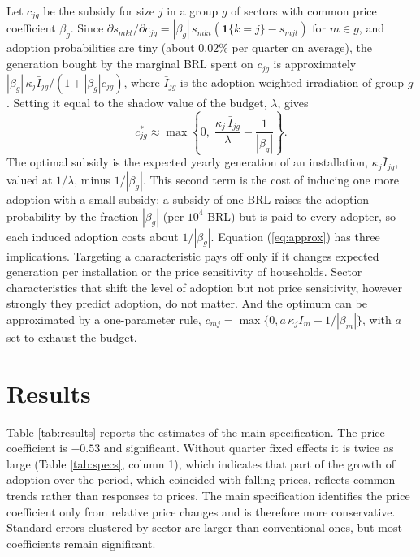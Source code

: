 \documentclass[final,3p,times,authoryear]{elsarticle}
\begin{document}
    Let $c_{jg}$ be the subsidy for size $j$ in a group $g$ of sectors with common price coefficient $\beta_g$. Since $\partial s_{mkt}/\partial c_{jg} = |\beta_g|\, s_{mkt}(\mathbf{1}\{k=j\} - s_{mjt})$ for $m \in g$, and adoption probabilities are tiny (about 0.02\% per quarter on average), the generation bought by the marginal BRL spent on $c_{jg}$ is approximately $|\beta_g|\, \kappa_j \bar I_{jg} / (1 + |\beta_g| c_{jg})$, where $\bar I_{jg}$ is the adoption-weighted irradiation of group $g$. Setting it equal to the shadow value of the budget, $\lambda$, gives
    \begin{equation}
        c^{*}_{jg} \approx \max\left\{0,\; \frac{\kappa_j\, \bar I_{jg}}{\lambda} - \frac{1}{|\beta_g|}\right\}.
        \label{eq:approx}
    \end{equation}
    The optimal subsidy is the expected yearly generation of an installation, $\kappa_j \bar I_{jg}$, valued at $1/\lambda$, minus $1/|\beta_g|$. This second term is the cost of inducing one more adoption with a small subsidy: a subsidy of one BRL raises the adoption probability by the fraction $|\beta_g|$ (per $10^4$ BRL) but is paid to every adopter, so each induced adoption costs about $1/|\beta_g|$. Equation (\ref{eq:approx}) has three implications. Targeting a characteristic pays off only if it changes expected generation per installation or the price sensitivity of households. Sector characteristics that shift the level of adoption but not price sensitivity, however strongly they predict adoption, do not matter. And the optimum can be approximated by a one-parameter rule, $c_{mj} = \max\{0, a\, \kappa_j I_m - 1/|\beta_m|\}$, with $a$ set to exhaust the budget.

\section{Results}
\label{Results}

    Table \ref{tab:results} reports the estimates of the main specification. The price coefficient is $-0.53$ and significant. Without quarter fixed effects it is twice as large (Table \ref{tab:specs}, column 1), which indicates that part of the growth of adoption over the period, which coincided with falling prices, reflects common trends rather than responses to prices. The main specification identifies the price coefficient only from relative price changes and is therefore more conservative. Standard errors clustered by sector are larger than conventional ones, but most coefficients remain significant.
\end{document}

